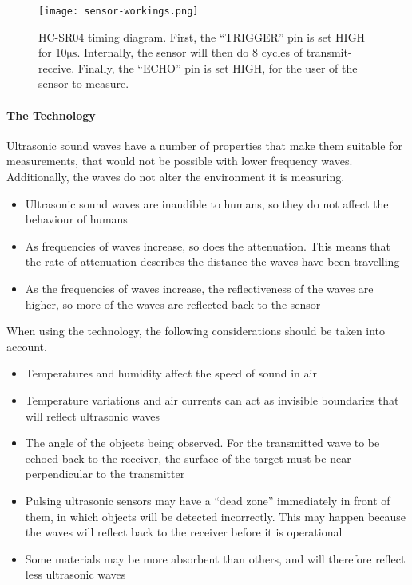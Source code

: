 \begin{figure}[htbp]
  \centering
  \texttt{[image: sensor-workings.png]}
  \caption[HC-SR04 timing diagram]{HC-SR04 timing diagram. First, the \enquote{TRIGGER} pin is set HIGH for 10$\si{\micro\second}$. Internally, the sensor will then do 8 cycles of transmit-receive. Finally, the \enquote{ECHO} pin is set HIGH, for the user of the sensor to measure.}
  \label{fig:sensor-workings}
\end{figure}

\paragraph{The Technology}
Ultrasonic sound waves have a number of properties that make them suitable for measurements, that would not be possible with lower frequency waves. Additionally, the waves do not alter the environment it is measuring.

\begin{itemize}
\item Ultrasonic sound waves are inaudible to humans, so they do not affect the behaviour of humans
\item As frequencies of waves increase, so does the attenuation. This means that the rate of attenuation describes the distance the waves have been travelling
\item As the frequencies of waves increase, the reflectiveness of the waves are higher, so more of the waves are reflected back to the sensor
\end{itemize}

When using the technology, the following considerations should be taken into account.

\begin{itemize}
  \item Temperatures and humidity affect the speed of sound in air
  \item Temperature variations and air currents can act as invisible boundaries that will reflect ultrasonic waves
  \item The angle of the objects being observed. For the transmitted wave to be echoed back to the receiver, the surface of the target must be near perpendicular to the transmitter
  \item Pulsing ultrasonic sensors may have a \enquote{dead zone} immediately in front of them, in which objects will be detected incorrectly. This may happen because the waves will reflect back to the receiver before it is operational
  \item Some materials may be more absorbent than others, and will therefore reflect less ultrasonic waves
\end{itemize}

